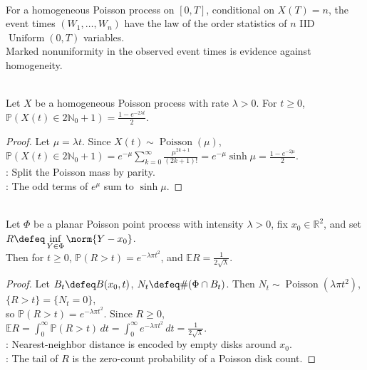 \begin{remark} \label{rem:poisson-event-times-uniform-diagnostic} \\
For a homogeneous Poisson process on $[0,T]$, conditional on $X(T)=n$, the event times $(W_1,\ldots,W_n)$ have the law of the order statistics of $n$ IID $\operatorname{Uniform}(0,T)$ variables.\\
Marked nonuniformity in the observed event times is evidence against homogeneity.
\end{remark}

\begin{proposition} \label{prop:poisson-odd-count-probability} \\
Let $X$ be a homogeneous Poisson process with rate $\lambda>0$. For $t\geq0$, $\mathbb{P}(X(t)\in2\mathbb{N}_0+1)=\frac{1-e^{-2\lambda t}}{2}$.
\begin{proof} Let $\mu=\lambda t$. Since $X(t)\sim\operatorname{Poisson}(\mu)$, $\mathbb{P}(X(t)\in2\mathbb{N}_0+1)=e^{-\mu}\sum\limits_{k=0}^{\infty}\frac{\mu^{2k+1}}{(2k+1)!}=e^{-\mu}\sinh\mu=\frac{1-e^{-2\mu}}{2}$.\\
: Split the Poisson mass by parity.\\
: The odd terms of $e^{\mu}$ sum to $\sinh\mu$.
\end{proof}
\end{proposition}

\begin{proposition} \label{prop:planar-poisson-nearest-neighbor} \\
Let $\Phi$ be a planar Poisson point process with intensity $\lambda>0$, fix $x_0\in\mathbb{R}^2$, and set $R\defeq\inf\limits_{Y\in\Phi}\norm{Y-x_0}$.\\
Then for $t\geq0$, $\mathbb{P}(R>t)=e^{-\lambda\pi t^2}$, and $\mathbb{E}R=\frac{1}{2\sqrt{\lambda}}$.
\begin{proof} Let $B_t\defeq B(x_0,t)$, $N_t\defeq\#(\Phi\cap B_t)$. Then $N_t\sim\operatorname{Poisson}(\lambda\pi t^2)$, $\{R>t\}=\{N_t=0\}$,\\
so $\mathbb{P}(R>t)=e^{-\lambda\pi t^2}$. Since $R\geq0$, $\mathbb{E}R=\int_0^\infty\mathbb{P}(R>t)\,dt=\int_0^\infty e^{-\lambda\pi t^2}\,dt=\frac{1}{2\sqrt{\lambda}}$.\\
: Nearest-neighbor distance is encoded by empty disks around $x_0$.\\
: The tail of $R$ is the zero-count probability of a Poisson disk count.
\end{proof}
\end{proposition}

